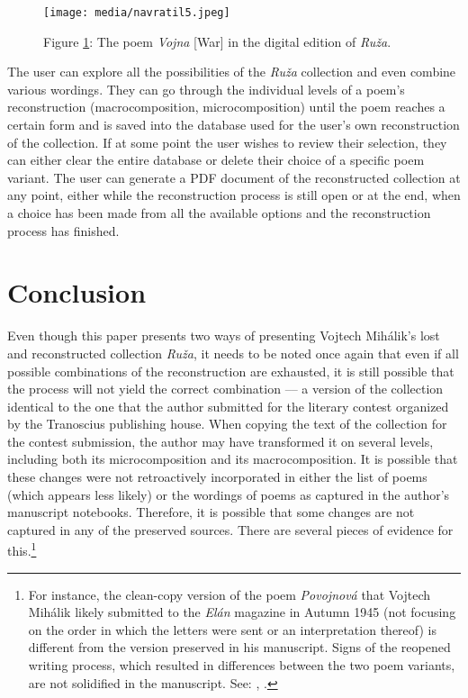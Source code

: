 \documentclass{article}
\begin{document}
\begin{figure}[H]
  \centering
  \texttt{[image: media/navratil5.jpeg]}
    \caption{Figure \ref{fig:navratil4}: The poem \emph{Vojna} [War] in the digital edition of \emph{Ruža}.}
    \label{fig:navratil4}
  \end{figure}

The user can explore all the possibilities of the \emph{Ruža} collection
and even combine various wordings. They can go through the individual
levels of a poem's reconstruction (macrocomposition, microcomposition)
until the poem reaches a certain form and is saved into the database
used for the user's own reconstruction of the collection. If at some
point the user wishes to review their selection, they can either clear
the entire database or delete their choice of a specific poem variant.
The user can generate a PDF document of the reconstructed collection at
any point, either while the reconstruction process is still open or at
the end, when a choice has been made from all the available options and
the reconstruction process has finished.

\hypertarget{conclusion}{%
\section*{Conclusion}\label{conclusion}}

Even though this paper presents two ways of presenting Vojtech Mihálik's
lost and reconstructed collection \emph{Ruža}, it needs to be noted once
again that even if all possible combinations of the reconstruction are
exhausted, it is still possible that the process will not yield the
correct combination –– a version of the collection identical to the one
that the author submitted for the literary contest organized by the
Tranoscius publishing house. When copying the text of the collection for
the contest submission, the author may have transformed it on several
levels, including both its microcomposition and its macrocomposition. It
is possible that these changes were not retroactively incorporated in
either the list of poems (which appears less likely) or the wordings of
poems as captured in the author's manuscript notebooks. Therefore, it is
possible that some changes are not captured in any of the preserved
sources. There are several pieces of evidence for this.\footnote{For
  instance, the clean-copy version of the poem \emph{Povojnová} that
  Vojtech Mihálik likely submitted to the \emph{Elán} magazine in Autumn
  1945 (not focusing on the order in which the letters were sent or an
  interpretation thereof) is different from the version preserved in his
  manuscript. Signs of the reopened writing process, which resulted in
  differences between the two poem variants, are not solidified in the
  manuscript. See: \cite{mihalik_skapinajuci_nodate}, .}
\end{document}
